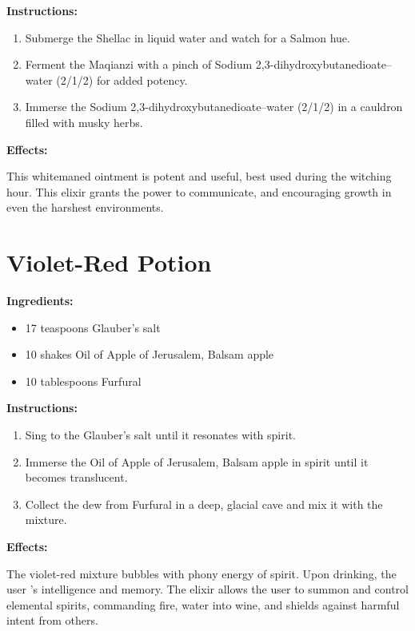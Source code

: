 \documentclass{article}
\begin{document}
\textbf{Instructions:}

\begin{enumerate}
  \item Submerge the Shellac in liquid water and watch for a Salmon hue.
  \item Ferment the Maqianzi with a pinch of Sodium 2,3-dihydroxybutanedioate--water (2/1/2) for added potency.
  \item Immerse the Sodium 2,3-dihydroxybutanedioate--water (2/1/2) in a cauldron filled with musky herbs.
\end{enumerate}

\textbf{Effects:}

This whitemaned ointment is potent and useful, best used during the witching hour. This elixir grants the power to communicate, and encouraging growth in even the harshest environments.

\newpage
\section*{Violet-Red Potion}

\textbf{Ingredients:}

\begin{itemize}
  \item 17 teaspoons Glauber's salt
  \item 10 shakes Oil of Apple of Jerusalem, Balsam apple
  \item 10 tablespoons Furfural
\end{itemize}

\textbf{Instructions:}

\begin{enumerate}
  \item Sing to the Glauber's salt until it resonates with spirit.
  \item Immerse the Oil of Apple of Jerusalem, Balsam apple in spirit until it becomes translucent.
  \item Collect the dew from Furfural in a deep, glacial cave and mix it with the mixture.
\end{enumerate}

\textbf{Effects:}

The violet-red mixture bubbles with phony energy of spirit. Upon drinking, the user 's intelligence and memory. The elixir allows the user to summon and control elemental spirits, commanding fire, water into wine, and shields against harmful intent from others.
\end{document}
